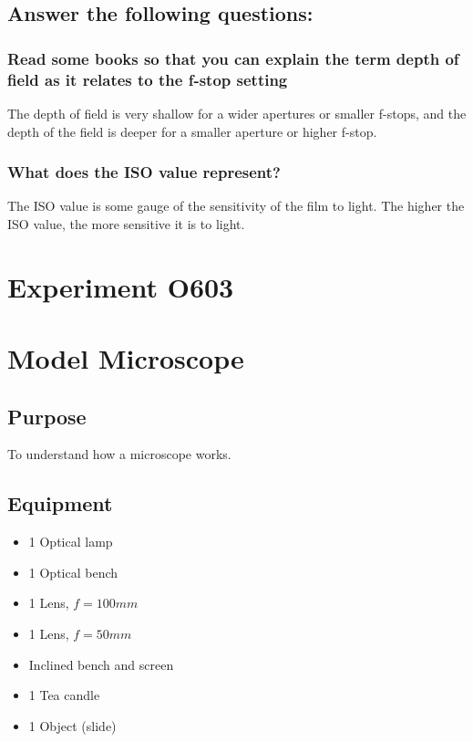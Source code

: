 \documentclass[12pt]{article}
\begin{document}
\subsection*{Answer the following questions:}

\subsubsection*{Read some books so that you can explain the term depth of field as it relates to the f-stop setting}

The depth of field is very shallow for a wider apertures or smaller f-stops, and the depth of the field is deeper for a smaller aperture or higher f-stop.

\subsubsection*{What does the ISO value represent?}

The ISO value is some gauge of the sensitivity of the film to light. The higher the ISO value, the more sensitive it is to light.

\section*{Experiment O603}

\section*{Model Microscope}

\subsection*{Purpose}

To understand how a microscope works.

\subsection*{Equipment}

\begin{itemize}
\item 1 Optical lamp
\item 1 Optical bench
\item 1 Lens, $f=100 mm$
\item 1 Lens, $f=50 mm$
\item Inclined bench and screen
\item 1 Tea candle
\item 1 Object (slide)
\end{itemize}
\end{document}
